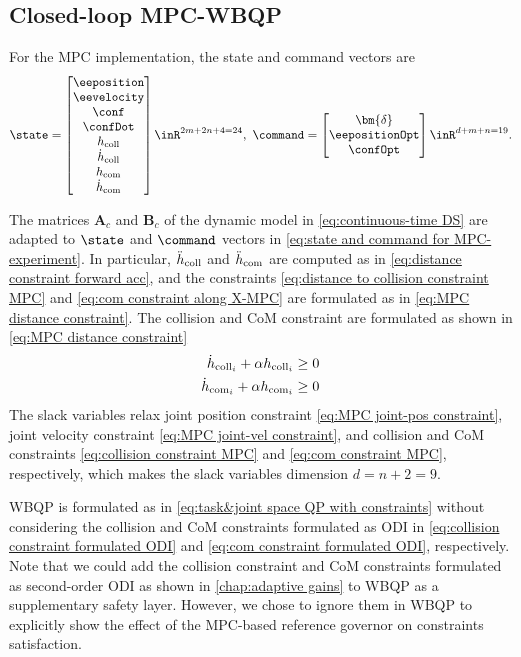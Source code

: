 \subsection{Closed-loop MPC-WBQP}
 For the MPC implementation, the state and command vectors are
\begin{equation}\label{eq:state and command for MPC-experiment}
	\state= \begin{bmatrix}
		\eeposition \\ \eevelocity \\ \conf \\ \confDot \\ h_{\rm coll} \\ \dot{h}_{\rm coll} \\ h_{\rm com} \\ \dot{h}_{\rm com} 
	\end{bmatrix}\inR^{2m+2n+4=24}, \ \command = \begin{bmatrix}
		\bm{\delta} \\ \eepositionOpt \\ \confOpt
	\end{bmatrix}\inR^{d+m+n = 19}.
\end{equation}

The matrices $\mathbf{A}_c$ and $\mathbf{B}_c$ of the dynamic model in \cref{eq:continuous-time DS} are adapted to $\state$ and $\command$ vectors in \cref{eq:state and command for MPC-experiment}. In particular, $\ddot{h}_{\rm coll}$ and $\ddot{h}_{\rm com}$ are computed as in \cref{eq:distance constraint forward acc}, and the constraints \cref{eq:distance to collision constraint MPC} and \cref{eq:com constraint along X-MPC} are formulated as in \cref{eq:MPC distance constraint}.
The collision and CoM constraint are formulated as shown in \cref{eq:MPC distance constraint}
\begin{align}
\label{eq:collision constraint MPC}	\dot{h}_{{\rm coll}_i} + \alpha h_{{\rm coll}_i}  &\geq 0 \\
\label{eq:com constraint MPC}	\dot{h}_{{\rm com}_i} + \alpha h_{{\rm com}_i}  &\geq 0
\end{align}
The slack variables relax joint position constraint \cref{eq:MPC joint-pos constraint}, joint velocity constraint \cref{eq:MPC joint-vel constraint}, and collision and CoM constraints \cref{eq:collision constraint MPC} and \cref{eq:com constraint MPC}, respectively, which makes the slack variables dimension $d=n+2=9$.

 WBQP is formulated as in \cref{eq:task&joint space QP with constraints} without considering the collision and CoM constraints formulated as ODI in \cref{eq:collision constraint formulated ODI} and \cref{eq:com constraint formulated ODI}, respectively. 
Note that we could add the collision constraint and CoM constraints formulated as second-order ODI as shown in \cref{chap:adaptive gains} to WBQP as a supplementary safety layer. However, we chose to ignore them in WBQP to explicitly show the effect of the MPC-based reference governor on constraints satisfaction. 
 
